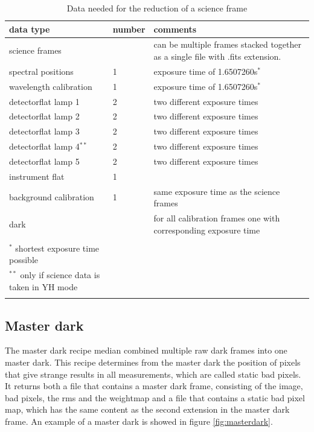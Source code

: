 \documentclass[twoside,single]{lion-msc}
\begin{document}
\begin{longtable}{| p{} | p{} | p{ }|}
\hline
\textbf{data type} & \textbf{number} & \textbf{comments}\\\hline
science frames&  &can be multiple frames stacked together as a single file with .fits extension.\\\hline
spectral positions & 1 & exposure time of 1.6507260s$^*$	\\\hline	
wavelength calibration & 1 & exposure time of 1.6507260s$^*$ \\\hline
detectorflat lamp 1 & 2 & two different exposure times\\\hline
detectorflat lamp 2 & 2 & two different exposure times\\\hline
detectorflat lamp 3 & 2 & two different exposure times\\\hline
detectorflat lamp 4$^{**}$ & 2 & two different exposure times\\\hline
detectorflat lamp 5 & 2 & two different exposure times\\\hline
instrument flat & 1 & \\\hline
background calibration & 1 & same exposure time as the science frames\\\hline
dark & & for all calibration frames one with corresponding exposure time\\\hline
\caption*{\\$^*$ shortest exposure time possible\\ $^{**}$ only if science data is taken in YH mode}\\%
\caption{Data needed for the reduction of a science frame}%
\label{Tab:data}
\end{longtable}%

\subsection{Master dark}
The master dark recipe median combined multiple raw dark frames into one master dark. This recipe determines from the master dark the position of pixels that give strange results in all measurements, which are called static bad pixels. It returns both a file that contains a master dark frame, consisting of the image, bad pixels, the rms and the weightmap and a file that contains a static bad pixel map, which has the same content as the second extension in the master dark frame. An example of a master dark is showed in figure \ref{fig:masterdark}. 
\bigskip
\end{document}
